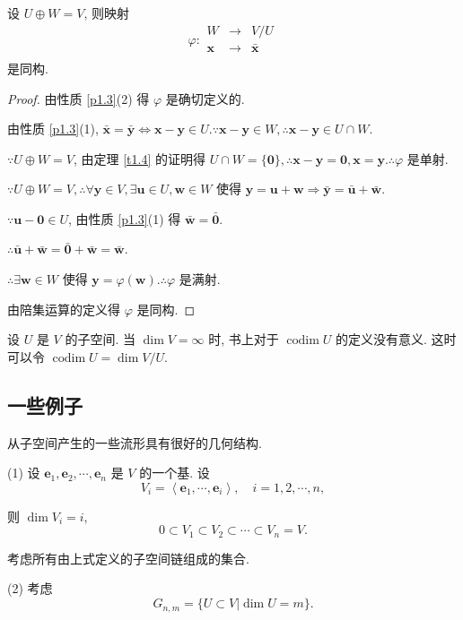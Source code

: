 \documentclass[color=black,device=normal,lang=cn,mode=geye]{elegantnote}
\begin{document}
\begin{theorem}[书上的定理 10]
    设 $U\oplus W=V$, 则映射
    \[\varphi:\begin{array}{rcl}
        W & \to & V/U \\
        \boldsymbol{x} & \to & \bar{\boldsymbol{x}} \\
    \end{array}\]
    是同构.
\end{theorem}
\begin{proof}
    由性质 \ref{p1.3}(2) 得 $\varphi$ 是确切定义的.
    
    由性质 \ref{p1.3}(1), $\bar{\boldsymbol{x}}=\bar{\boldsymbol{y}}\Leftrightarrow\boldsymbol{x}-\boldsymbol{y}\in U.\because\boldsymbol{x}-\boldsymbol{y}\in W,\therefore\boldsymbol{x}-\boldsymbol{y}\in U\cap W$.

    $\because U\oplus W=V$, 由定理 \ref{t1.4} 的证明得 $U\cap W=\{\boldsymbol{0}\},\therefore\boldsymbol{x}-\boldsymbol{y}=\boldsymbol{0},\boldsymbol{x}=\boldsymbol{y}.\therefore\varphi$ 是单射.

    $\because U\oplus W=V,\therefore\forall\boldsymbol{y}\in V,\exists\boldsymbol{u}\in U,\boldsymbol{w}\in W$ 使得 $\boldsymbol{y}=\boldsymbol{u}+\boldsymbol{w}\Rightarrow\bar{\boldsymbol{y}}=\bar{\boldsymbol{u}}+\bar{\boldsymbol{w}}$.

    $\because\boldsymbol{u}-\boldsymbol{0}\in U$, 由性质 \ref{p1.3}(1) 得 $\bar{\boldsymbol{w}}=\bar{\boldsymbol{0}}$.

    $\therefore\bar{\boldsymbol{u}}+\bar{\boldsymbol{w}}=\bar{\boldsymbol{0}}+\bar{\boldsymbol{w}}=\bar{\boldsymbol{w}}$.
    
    $\therefore\exists\boldsymbol{w}\in W$ 使得 $\boldsymbol{y}=\varphi(\boldsymbol{w}).\therefore\varphi$ 是满射.
    
    由陪集运算的定义得 $\varphi$ 是同构.
\end{proof}
设 $U$ 是 $V$ 的子空间. 当 $\dim V=\infty$ 时, 书上对于 $\operatorname{codim}U$ 的定义没有意义. 这时可以令 $\operatorname{codim}U=\dim V/U$.
\subsection{一些例子}
\begin{example}
    从子空间产生的一些流形具有很好的几何结构.

    (1) 设 $\boldsymbol{e}_1,\boldsymbol{e}_2,\cdots,\boldsymbol{e}_n$ 是 $V$ 的一个基. 设
    \[V_i=\left<\boldsymbol{e}_1,\cdots,\boldsymbol{e}_i\right>,\quad i=1,2,\cdots,n,\]

    则 $\dim V_i=i$,
    \[0\subset V_1\subset V_2\subset\cdots\subset V_n=V.\]
    
    考虑所有由上式定义的子空间链组成的集合.

    (2) 考虑
    \[G_{n,m}=\{U\subset V|\dim U=m\}.\]
\end{example}
\end{document}
